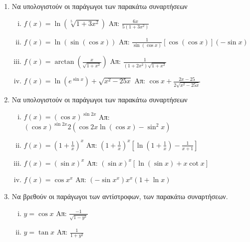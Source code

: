 



\pagestyle{askhseis}




\begin{center}
  \minibox{\large \bfseries \textcolor{Col1}{Ασκήσεις στις Παραγώγους}}
\end{center}

\vspace{\baselineskip}

\begin{enumerate}

  \item Να υπολογιστούν οι παράγωγοι των παρακάτω συναρτήσεων
    \begin{enumerate}[(i)]
      \item $ f(x) = \ln{(\sqrt[5]{1+3x^{2}})} $ \hfill Απ: $
        \frac{6x}{5(1+3x^{2})} $
      \item $ f(x) = \ln({\sin({\cos{x}})}) $ \hfill Απ: $
        \frac{1}{\sin{(\cos{x})}} [\cos{(\cos{x})}] (- \sin{x}) $ 
      \item $ f(x) = \arctan (\frac{x}{\sqrt{1 + x^{2}}}) $ \hfill Απ: $
        \frac{1}{(1+2x^{2})\sqrt{1 + x^{2}}} $
      \item $ f(x) = \ln{(e^{\sin{x}})} + \sqrt{x^{2} - 25x} $ \hfill Απ: $
        \cos{x} + \frac{2x - 25}{2 \sqrt{x^{2} - 25x}}  $  
    \end{enumerate}

  \item  Να υπολογιστούν οι παράγωγοι των παρακάτω συναρτήσεων

    \begin{enumerate}[(i)]
      \item $ f(x) = (\cos{x})^{\sin{2x}} $ \hfill Απ: $
        (\cos{x})^{\sin{2x}} 2(\cos{2x} \ln{(\cos{x})} - \sin^{2}{x}) $
      \item $ f(x) = \left(1 + \frac{1}{x} \right)^{x} $ \hfill Απ: $
        \left(1 + \frac{1}{x}\right)^{x}\left[\ln{(1 + \frac{1}{x})} -
        \frac{1}{x+1}\right] $
      \item $ f(x)=(\sin{x})^{x} $ \hfill Απ: $ (\sin{x})^{x}[\ln{(\sin{x}
        )} + x \cot{x}] $ 
      \item $ f(x)=\cos{x}^{x} $ \hfill Απ: $ (- \sin{x^{x}})x^{x} (1 +
        \ln{x}) $
    \end{enumerate}

  \item Να βρεθούν οι παράγωγοι των αντίστροφων, των παρακάτω συναρτήσεων.
    \begin{enumerate}[(i)]
      \item $ y = \cos{x} $ \hfill Απ: $ \frac{-1}{\sqrt{1 - y^{2}}} $
      \item $ y = \tan{x} $ \hfill Απ: $ \frac{1}{1 + y^{2}} $
    \end{enumerate}


\end{enumerate}

